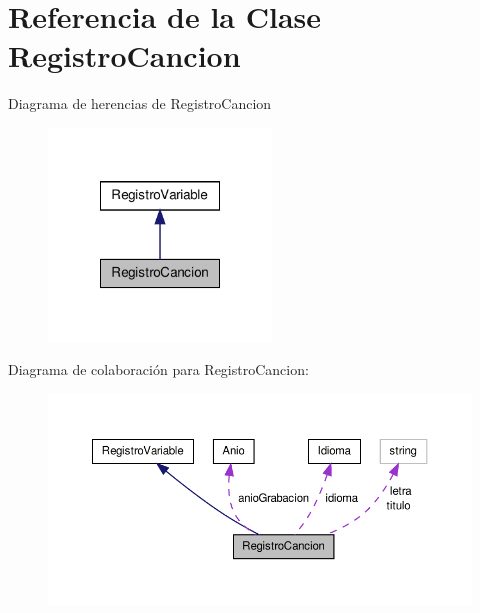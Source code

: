 \hypertarget{class_registro_cancion}{\section{\-Referencia de la \-Clase \-Registro\-Cancion}
\label{class_registro_cancion}
}


\-Diagrama de herencias de \-Registro\-Cancion
\nopagebreak
\begin{figure}[H]
\begin{center}
\leavevmode
\includegraphics[width=168pt]{class_registro_cancion__inherit__graph}
\end{center}
\end{figure}


\-Diagrama de colaboración para \-Registro\-Cancion\-:
\nopagebreak
\begin{figure}[H]
\begin{center}
\leavevmode
\includegraphics[width=350pt]{class_registro_cancion__coll__graph}
\end{center}
\end{figure}
